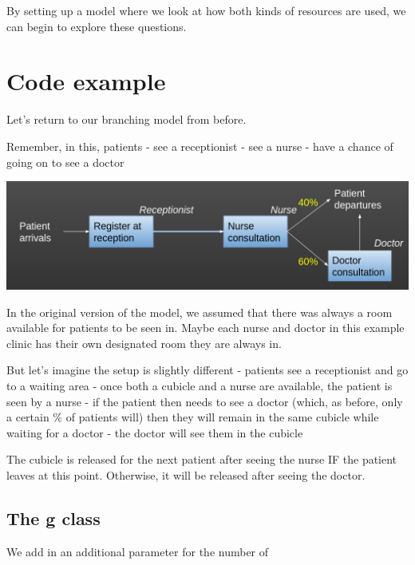\documentclass[
  letterpaper,
  DIV=11,
  numbers=noendperiod]{scrreprt}
\begin{document}
By setting up a model where we look at how both kinds of resources are
used, we can begin to explore these questions.

\section{Code example}\label{code-example}

Let's return to our branching model from before.

Remember, in this, patients - see a receptionist - see a nurse - have a
chance of going on to see a doctor

\includegraphics{images/example_simple_model_branching.png}

In the original version of the model, we assumed that there was always a
room available for patients to be seen in. Maybe each nurse and doctor
in this example clinic has their own designated room they are always in.

But let's imagine the setup is slightly different - patients see a
receptionist and go to a waiting area - once both a cubicle and a nurse
are available, the patient is seen by a nurse - if the patient then
needs to see a doctor (which, as before, only a certain \% of patients
will) then they will remain in the same cubicle while waiting for a
doctor - the doctor will see them in the cubicle

The cubicle is released for the next patient after seeing the nurse IF
the patient leaves at this point. Otherwise, it will be released after
seeing the doctor.

\subsection{The g class}\label{the-g-class-8}

We add in an additional parameter for the number of
\end{document}
